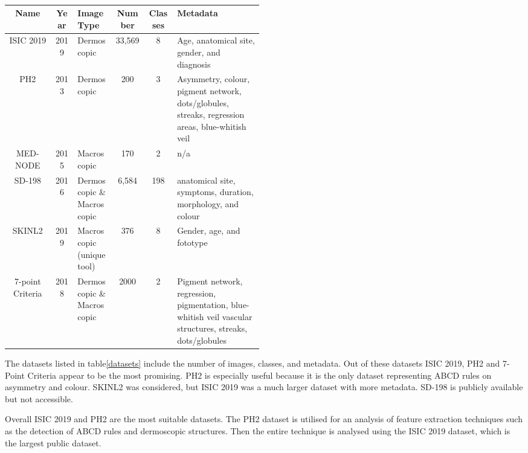 \begin{table}
    \small
    \begin{tabular}{|c|c|p{0.15\linewidth}|c|c|p{0.34\linewidth}|}
        \hline
        Name & Year & Image Type & Number & Classes & Metadata \\
        \hline
        ISIC 2019 & 2019 & Dermoscopic & 33,569 & 8 & Age, anatomical site, gender, and diagnosis
        \\
        \hline
        PH2 & 2013 & Dermoscopic & 200 & 3 & Asymmetry, colour, pigment network, dots/globules, streaks, regression areas, blue-whitish veil
        \\
        \hline
        MED-NODE  & 2015 & Macroscopic & 170 & 2 & n/a
        \\
        \hline  
        SD-198  & 2016 & Dermoscopic \& Macroscopic & 6,584 & 198 & anatomical site, symptoms, duration, morphology, and colour
        \\
        \hline  
        SKINL2 & 2019 & Macroscopic (unique tool) & 376 & 8 & Gender, age, and fototype
        \\
        \hline
        7-point Criteria & 2018 & Dermoscopic \& Macroscopic & 2000 & 2 & Pigment network, regression, pigmentation, blue-whitish veil vascular structures, streaks, dots/globules
        \\
        \hline  
    \end{tabular}
    \caption{}
    \end{table} \label{datasets}

The datasets listed in table\ref{datasets} include the number of images, classes, and metadata. Out of these datasets ISIC 2019, PH2 and 7-Point Criteria appear to be the most promising. PH2 is especially useful because it is the only dataset representing ABCD rules on asymmetry and colour. SKINL2 was considered, but ISIC 2019 was a much larger dataset with more metadata. SD-198 is publicly available but not accessible.

Overall ISIC 2019 and PH2 are the most suitable datasets. The PH2 dataset is utilised for an analysis of feature extraction techniques such as the detection of ABCD rules and dermoscopic structures. Then the entire technique is analysed using the ISIC 2019 dataset, which is the largest public dataset.

